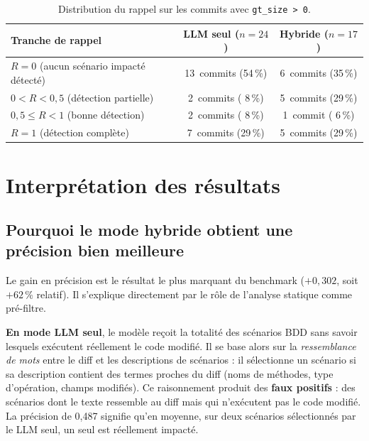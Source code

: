 \documentclass[12pt,a4paper]{article}
\begin{document}
\begin{table}[H]
\centering
\begin{tabular}{lcc}
\toprule
\textbf{Tranche de rappel}
  & \textbf{LLM seul} ($n = 24$)
  & \textbf{Hybride} ($n = 17$) \\
\midrule
$R = 0$ \quad (aucun scénario impacté détecté)  & 13~commits (54\,\%) & 6~commits (35\,\%) \\
$0 < R < 0{,}5$ \quad (détection partielle)     &  2~commits ( 8\,\%) & 5~commits (29\,\%) \\
$0{,}5 \leq R < 1$ \quad (bonne détection)      &  2~commits ( 8\,\%) & 1~commit  ( 6\,\%) \\
$R = 1$ \quad (détection complète)              &  7~commits (29\,\%) & 5~commits (29\,\%) \\
\bottomrule
\end{tabular}
\caption{Distribution du rappel sur les commits avec \texttt{gt\_size > 0}.}
\label{tab:distribution}
\end{table}

\section{Interprétation des résultats}

\subsection{Pourquoi le mode hybride obtient une précision bien meilleure}

Le gain en précision est le résultat le plus marquant du benchmark
($+0{,}302$, soit $+62\,\%$ relatif). Il s'explique directement par le rôle
de l'analyse statique comme pré-filtre.

\textbf{En mode LLM seul}, le modèle reçoit la totalité des scénarios BDD
sans savoir lesquels exécutent réellement le code modifié. Il se base alors
sur la \emph{ressemblance de mots} entre le diff et les descriptions de
scénarios : il sélectionne un scénario si sa description contient des termes
proches du diff (noms de méthodes, type d'opération, champs modifiés).
Ce raisonnement produit des \textbf{faux positifs} : des scénarios dont
le texte ressemble au diff mais qui n'exécutent pas le code modifié.
La précision de 0{,}487 signifie qu'en moyenne, sur deux scénarios sélectionnés
par le LLM seul, un seul est réellement impacté.
\end{document}
